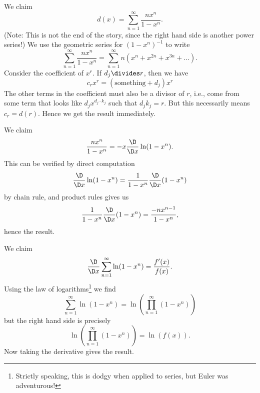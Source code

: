 \documentclass{article}
\begin{document}
 We claim
\begin{equation}
  d(x) = \sum^{\infty}_{n=1}\frac{nx^{n}}{1-x^{n}}.
\end{equation}
(Note: This is not the end of the story, since the right hand side is
another power series!) We use the geometric series for $(1 -
x^{n})^{-1}$ to write
\begin{equation}
\sum^{\infty}_{n=1}\frac{nx^{n}}{1-x^{n}} = \sum^{\infty}_{n=1}n(x^{n} + x^{2n} + x^{3n} + \dots).
\end{equation}
Consider the coefficient of $x^{r}$. If $d_{j}\divides r$, then we have
\begin{equation}
 c_{r}x^{r} = (\mbox{something} + d_{j})x^{r}
\end{equation}
The other terms in the coefficient must also be a divisor of $r$, i.e.,
come from some term that looks like $d_{j}x^{d_{j}\cdot k_{j}}$ such
that $d_{j}k_{j} = r$. But this necessarily means $c_{r}=d(r)$. Hence we
get the result immediately.

 We claim
\begin{equation}
  \frac{nx^{n}}{1-x^{n}}=-x\frac{\D}{\D x}\ln(1 - x^{n}).
\end{equation}
This can be verified by direct computation
\begin{equation}
    \frac{\D}{\D x}\ln(1 - x^{n}) = \frac{1}{1-x^{n}}\frac{\D}{\D x}(1-x^{n})
\end{equation}
by chain rule, and product rules gives us
\begin{equation}
\frac{1}{1-x^{n}}\frac{\D}{\D x}(1-x^{n}) = \frac{-nx^{n-1}}{1 - x^{n}},
\end{equation}
hence the result.

 We claim
\begin{equation}
  \frac{\D}{\D x}\sum^{\infty}_{n=1}\ln(1 - x^{n}) = \frac{f'(x)}{f(x)}.
\end{equation}
Using the law of logarithms\footnote{Strictly speaking, this is dodgy
  when applied to series, but Euler was adventurous!} we find
\begin{equation}
\sum^{\infty}_{n=1}\ln(1 - x^{n}) = \ln\left(\prod^{\infty}_{n=1}(1 - x^{n})\right)
\end{equation}
but the right hand side is precisely
\begin{equation}
 \ln\left(\prod^{\infty}_{n=1}(1 - x^{n})\right) = \ln(f(x)).
\end{equation}
Now taking the derivative gives the result.
\end{document}
